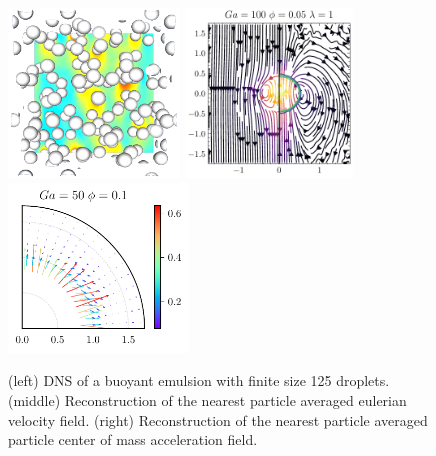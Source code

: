 \documentclass{icnmmf5}
\begin{document}


\begin{figure}[b]
  \begin{center}
   \includegraphics[height=4.5cm]{image/3D/P_PHI_5.png}
   \includegraphics[height=4.5cm]{image/HOMOGENEOUS/Stream/Stream_PHI_5_Ga_100_l_1.pdf}
   \includegraphics[height=4.5cm]{image/HOMOGENEOUS/fDrop/F_mu_r_1_0_Ga_50_PHI_0_1.pdf}
  \end{center}
  \caption{(left) DNS of a buoyant emulsion with finite size 125 droplets.
  (middle) Reconstruction of the nearest particle averaged eulerian velocity field.
  (right) Reconstruction of the nearest particle averaged particle center of mass acceleration field.}
  \label{fig:tower}
\end{figure}

\end{document}

